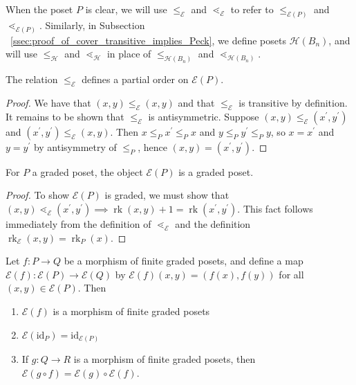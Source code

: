 \documentclass[smallextended]{svjour3}       %
\numberwithin{equation}{section}
\newcommand{\id}{\mathrm{id}}
\newcommand\rk{\operatorname{rk}}
\begin{document}
When the poset $P$ is clear, we will use $\leq_{\mathcal E}$ and $\lessdot_{\mathcal E}$ to refer to $\leq_{\mathcal E(P)}$ and $\lessdot_{\mathcal E(P)}$. Similarly, in Subsection ~\ref{ssec:proof_of_cover_transitive_implies_Peck}, we define posets $\mathcal H(B_n)$, and will use $\leq_{\mathcal H}$ and $\lessdot_{\mathcal H}$ in place of $\leq_{\mathcal H(B_n)}$ and $\lessdot_{\mathcal H(B_n)}$.

\begin{lemma}\label{lem:f_partial_order}
The relation $\le_{\mathcal E}$ defines a partial order on $\mathcal E(P)$.
\end{lemma}

\begin{proof}
We have that $(x, y)\le_{\mathcal E} (x, y)$ and that $\le_{\mathcal E}$ is transitive by definition.  It remains to be shown that $\le_{\mathcal E}$ is antisymmetric.  Suppose $(x, y)\le_{\mathcal E} (x^\prime, y^\prime)$ and $(x^\prime, y^\prime)\le_{\mathcal E} (x, y)$.  Then $x\le_P x^\prime \le_P x$ and $y\le_P y^\prime \le_P y$, so $x = x^\prime$ and $y=y^\prime$ by antisymmetry of $\le_P$, hence $(x, y) = (x^\prime, y^\prime)$.
\end{proof}

\begin{lemma}\label{lem:FP_graded_poset}
For $P$ a graded poset, the object $\mathcal E(P)$ is a graded poset.
\end{lemma}

\begin{proof}
To show $\mathcal E(P)$ is graded, we must show that $(x, y) \lessdot_{\mathcal E} (x^\prime, y^\prime) \implies \rk(x, y)+1 = \rk(x^\prime , y^\prime)$.  This fact follows immediately from the definition of $\lessdot_{\mathcal E}$ and the definition $\rk_{\mathcal E}(x, y) = \rk_P(x)$.
\end{proof}

\begin{lemma}\label{lem:Ff_poset_morphism}
Let $f\colon P\rightarrow Q$ be a morphism of finite graded posets, and define a map $\mathcal E(f)\colon \mathcal E(P)\rightarrow \mathcal E(Q)$ by $\mathcal{E}(f)(x,y) = (f(x),f(y))$ for all $(x,y)\in \mathcal{E}(P)$.  Then

\begin{enumerate}
\item $\mathcal{E}(f)$ is a morphism of finite graded posets
\item $\mathcal{E}(\id_P) = \id_{\mathcal{E}(P)}$
\item If $g\colon Q\rightarrow R$ is a morphism of finite graded posets, then $\mathcal E(g\circ f) = \mathcal E(g)\circ\mathcal E(f)$.
\end{enumerate}
\end{lemma}
\end{document}
